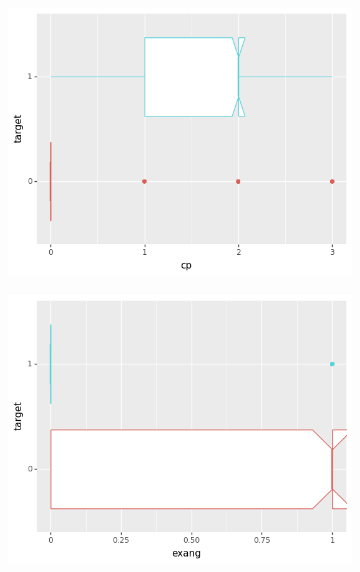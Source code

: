 \begin{figure}[b]
     \begin{subfigure}[b]{0.32\textwidth}
         \centering
         \includegraphics[width=\textwidth]{plots/target-cp}
     \end{subfigure}
     \begin{subfigure}[b]{0.32\textwidth}
         \centering
         \includegraphics[width=\textwidth]{plots/target-exang}
     \end{subfigure}
     \begin{subfigure}[b]{0.32\textwidth}
         \centering

\end{subfigure}
\end{figure}

